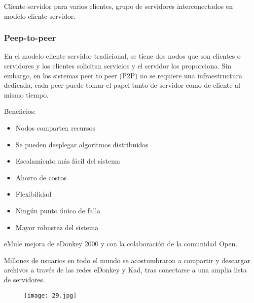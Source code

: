 Cliente servidor para varios clientes, grupo de servidores interconectados en modelo cliente servidor.

\begin{figure}[h!]
  \begin{subfigure}
    \texttt{[image: 27.jpg]}
  \end{subfigure}
  \hfill
  \begin{subfigure}
    \texttt{[image: 28.jpg]}
  \end{subfigure}
\end{figure}

{\raggedright
\subsubsection{\textbf{Peep-to-peer}}
}

En el modelo cliente servidor tradicional, se tiene dos nodos que son clientes o servidores y los clientes solicitan servicios y el servidor los proporciona. Sin embargo, en los sistemas peer to peer (P2P) no se requiere una infraestructura dedicada, cada peer puede tomar el papel tanto de servidor como de cliente al mismo tiempo.

{\raggedright
Beneficios:
}

\begin{itemize}
	\item Nodos comparten recursos
	\item Se pueden desplegar algoritmos distribuidos
	\item Escalamiento más fácil del sistema
	\item Ahorro de costos
	\item Flexibilidad
	\item Ningún punto único de falla
	\item Mayor robustez del sistema
\end{itemize}

eMule mejora de eDonkey 2000 y con la colaboración de la comunidad Open.

Millones de usuarios en todo el mundo se acostumbraron a compartir y descargar archivos a través de las redes eDonkey y Kad, tras conectarse a una amplia lista de servidores.

\begin{figure}[h!]
		\centering
		{\texttt{[image: 29.jpg]}\par} \vspace{1cm}
\end{figure}

